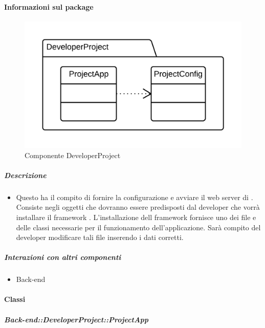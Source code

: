   \paragraph{Informazioni sul package} 
    \begin{figure}[H] 
      \begin{center} 
        \includegraphics[width=\textwidth]{packages/Back-end::DeveloperProject.png}  
        \caption{Componente DeveloperProject}
      \end{center}  
    \end{figure} 
  \subparagraph{Descrizione} 
    \begin{itemize}
    \item[] Questo  ha il compito di fornire la configurazione e avviare il web server di . Consiste negli oggetti che dovranno essere predisposti dal developer che vorrà installare il framework . L'installazione dell framework  fornisce uno  dei file e delle classi necessarie per il funzionamento dell'applicazione. Sarà compito del developer modificare tali file inserendo i dati corretti.
    \end{itemize} 
  \subparagraph{Interazioni con altri componenti} 
    \begin{itemize} 
        \item Back-end  
    \end{itemize} 
    \paragraph{Classi}
      \subparagraph{Back-end::DeveloperProject::ProjectApp}
        
